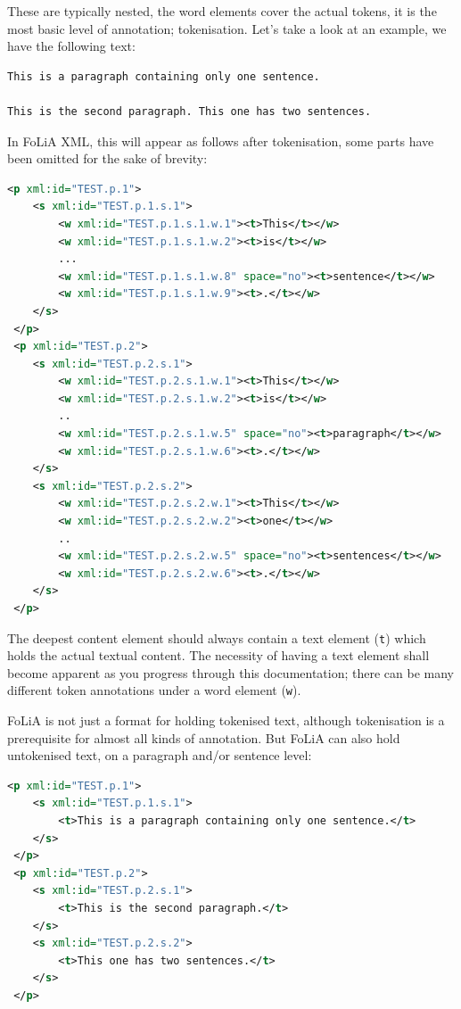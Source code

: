 \documentclass[a4paper,12pt]{report}
\begin{document}
These are typically nested, the word elements cover the actual tokens, it is the most basic level of annotation; tokenisation. Let's take a look at an example, we have the following text:

\begin{verbatim}
This is a paragraph containing only one sentence.

This is the second paragraph. This one has two sentences.
\end{verbatim}

In FoLiA XML, this will appear as follows after tokenisation, some parts have been omitted for the sake of brevity:


\begin{lstlisting}[language=xml]
 <p xml:id="TEST.p.1">
    <s xml:id="TEST.p.1.s.1">        
        <w xml:id="TEST.p.1.s.1.w.1"><t>This</t></w>
        <w xml:id="TEST.p.1.s.1.w.2"><t>is</t></w>
        ...
        <w xml:id="TEST.p.1.s.1.w.8" space="no"><t>sentence</t></w>
        <w xml:id="TEST.p.1.s.1.w.9"><t>.</t></w>
    </s>
 </p>
 <p xml:id="TEST.p.2">
    <s xml:id="TEST.p.2.s.1">
        <w xml:id="TEST.p.2.s.1.w.1"><t>This</t></w>
        <w xml:id="TEST.p.2.s.1.w.2"><t>is</t></w>    
        ..
        <w xml:id="TEST.p.2.s.1.w.5" space="no"><t>paragraph</t></w>    
        <w xml:id="TEST.p.2.s.1.w.6"><t>.</t></w>    
    </s>
    <s xml:id="TEST.p.2.s.2">
        <w xml:id="TEST.p.2.s.2.w.1"><t>This</t></w>
        <w xml:id="TEST.p.2.s.2.w.2"><t>one</t></w>    
        ..
        <w xml:id="TEST.p.2.s.2.w.5" space="no"><t>sentences</t></w>    
        <w xml:id="TEST.p.2.s.2.w.6"><t>.</t></w>    
    </s>
 </p>
\end{lstlisting}


The deepest content element should always contain a text element (\texttt{t}) which holds the actual textual content. The necessity of having a text element shall become apparent as you progress through this documentation; there can be many different token annotations under a word element (\texttt{w}).

FoLiA is not just a format for holding tokenised text, although tokenisation is a prerequisite for almost all kinds of annotation. But FoLiA can also hold untokenised text, on a paragraph and/or sentence level:

\begin{lstlisting}[language=xml]
 <p xml:id="TEST.p.1">
    <s xml:id="TEST.p.1.s.1">        
        <t>This is a paragraph containing only one sentence.</t>
    </s>
 </p>
 <p xml:id="TEST.p.2">
    <s xml:id="TEST.p.2.s.1">     
        <t>This is the second paragraph.</t>
    </s>
    <s xml:id="TEST.p.2.s.2">     
        <t>This one has two sentences.</t>
    </s>    
 </p>
\end{lstlisting}
\end{document}
